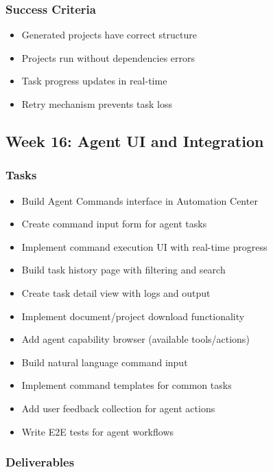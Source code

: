 \documentclass[12pt,oneside]{report}
\begin{document}
\subsubsection{Success Criteria}

\begin{itemize}
    \item Generated projects have correct structure
    \item Projects run without dependencies errors
    \item Task progress updates in real-time
    \item Retry mechanism prevents task loss
\end{itemize}

\subsection{Week 16: Agent UI and Integration}

\subsubsection{Tasks}

\begin{itemize}
    \item Build Agent Commands interface in Automation Center
    \item Create command input form for agent tasks
    \item Implement command execution UI with real-time progress
    \item Build task history page with filtering and search
    \item Create task detail view with logs and output
    \item Implement document/project download functionality
    \item Add agent capability browser (available tools/actions)
    \item Build natural language command input
    \item Implement command templates for common tasks
    \item Add user feedback collection for agent actions
    \item Write E2E tests for agent workflows
\end{itemize}

\subsubsection{Deliverables}
\end{document}
